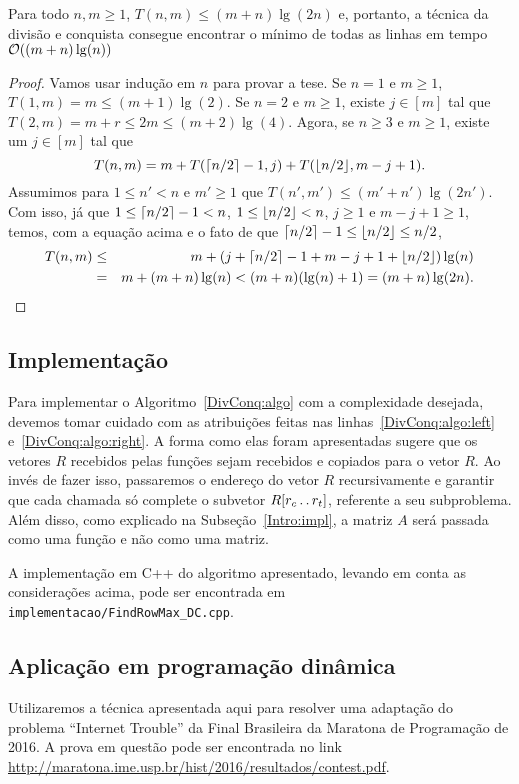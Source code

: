 \begin{prop}
Para todo $n,m \geq 1$, $T(n,m) \leq (m+n)\lg(2n)$ e, portanto, a técnica da divisão e conquista consegue encontrar o mínimo de todas as linhas em tempo $\mathcal{O}((m+n)\lg(n))$
\end{prop}

\begin{proof}
Vamos usar indução em $n$ para provar a tese. Se $n = 1$ e $m \geq 1$, $T(1,m) = m \leq (m+1)\lg(2)$. Se $n = 2$ e $m \geq 1$, existe $j \in [m]$ tal que $T(2,m) = m + r \leq 2m \leq (m+2)\lg(4)$. Agora, se $n \geq 3$ e $m \geq 1$, existe um $j \in [m]$ tal que 
$$ T(n,m) = m + T(\lceil n/2\rceil - 1, j) + T(\lfloor n/2\rfloor, m - j + 1). $$
Assumimos para $1 \leq n' < n$ e $m' \geq 1$ que $T(n',m') \leq (m'+n')\lg(2n')$. Com isso, já que $1 \leq \lceil n/2\rceil-1 < n$, $1 \leq \lfloor n/2\rfloor < n$, $j \geq 1$ e $m - j + 1 \geq 1$, temos, com a equação acima e o fato de que $\lceil n/2\rceil-1 \leq \lfloor n/2\rfloor \leq n/2$,
\begin{eqnarray*} 
    T(n,m) & \leq & m + (j + \lceil n/2\rceil - 1 + m - j + 1 + \lfloor n/2\rfloor)\lg(n) \\
           & =    & m + (m + n)\lg(n) < (m + n)(\lg(n) + 1) = (m + n)\lg(2n).
\end{eqnarray*}
\end{proof}

\subsection{Implementação} \label{DivisaoEConquista_Implementacao}
Para implementar o Algoritmo~\ref{DivConq:algo} com a complexidade desejada, devemos tomar cuidado com as atribuições feitas nas linhas~\ref{DivConq:algo:left} e~\ref{DivConq:algo:right}. A forma como elas foram apresentadas sugere que os vetores $R$ recebidos pelas funções sejam recebidos e copiados para o vetor $R$. Ao invés de fazer isso, passaremos o endereço do vetor $R$ recursivamente e garantir que cada chamada só complete o subvetor $R[r_c \,.\,.\, r_t]$, referente a seu subproblema. Além disso, como explicado na Subseção~\ref{Intro:impl}, a matriz $A$ será passada como uma função e não como uma matriz.

A implementação em C++ do algoritmo apresentado, levando em conta as considerações acima, pode ser encontrada em \texttt{implementacao/FindRowMax\_DC.cpp}.

\subsection{Aplicação em programação dinâmica} \label{DivConq:DP}
Utilizaremos a técnica apresentada aqui para resolver uma adaptação do problema ``Internet Trouble'' da Final Brasileira da Maratona de Programação de 2016. A prova em questão pode ser encontrada no link \url{http://maratona.ime.usp.br/hist/2016/resultados/contest.pdf}.  

